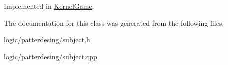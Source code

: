 Implemented in \hyperlink{class_kernel_game_afb01399b1b5d0e8b8bbbfb84466a7d20}{Kernel\-Game}.



The documentation for this class was generated from the following files\-:\begin{DoxyCompactItemize}
\item 
logic/patterdesing/\hyperlink{subject_8h}{subject.\-h}\item 
logic/patterdesing/\hyperlink{subject_8cpp}{subject.\-cpp}\end{DoxyCompactItemize}
